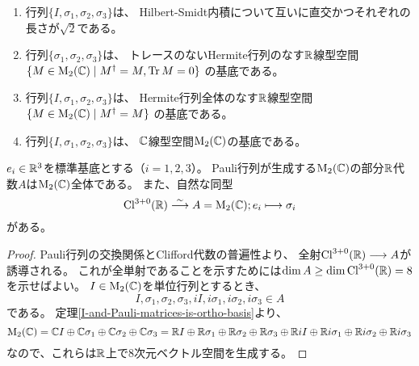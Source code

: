 \begin{thm}
  \label{I-and-Pauli-matrices-is-ortho-basis}
  \begin{enumerate}
    \item 行列$\{I, \sigma_1, \sigma_2, \sigma_3\}$は、
          Hilbert-Smidt内積について互いに直交かつそれぞれの長さが$\sqrt{2}$である。
    \item 行列$\{\sigma_1, \sigma_2, \sigma_3\}$は、
          トレースのないHermite行列のなす$\mathbb{R}$線型空間
          $\{M\in\operatorname{M}_2(\mathbb{C}) \mid M^\dagger=M, \operatorname{Tr} M = 0\}$
          の基底である。
    \item 行列$\{I, \sigma_1, \sigma_2, \sigma_3\}$は、
          Hermite行列全体のなす$\mathbb{R}$線型空間$\{M\in\operatorname{M}_2(\mathbb{C}) \mid M^\dagger=M\}$
          の基底である。
    \item 行列$\{I, \sigma_1, \sigma_2, \sigma_3\}$は、
          $\mathbb{C}$線型空間$\operatorname{M}_2(\mathbb{C})$の基底である。
  \end{enumerate}
\end{thm}

\begin{thm}
  $e_i \in \mathbb{R}^{3}$を標準基底とする（$i=1,2,3$）。
  Pauli行列が生成する$\operatorname{M}_2(\mathbb{C})$の部分$\mathbb{R}$代数$A$は$\operatorname{M}_2(\mathbb{C})$全体である。
  また、自然な同型
  \begin{equation}
    \operatorname{Cl}^{3+0}(\mathbb{R}) \stackrel{\sim}{\longrightarrow} A = \operatorname{M}_2(\mathbb{C}); e_i \longmapsto \sigma_i
  \end{equation}
  がある。
\end{thm}

\begin{proof}
  Pauli行列の交換関係とClifford代数の普遍性より、
  全射$\operatorname{Cl}^{3+0}(\mathbb{R})\longrightarrow A$が誘導される。
  これが全単射であることを示すためには$\dim A\geq\dim\operatorname{Cl}^{3+0}(\mathbb{R})=8$を示せばよい。
  $I\in\operatorname{M}_2(\mathbb{C})$を単位行列とするとき、
  \begin{equation}
    I, \sigma_1, \sigma_2, \sigma_3,
    iI, i\sigma_1, i\sigma_2, i\sigma_3 \in A
  \end{equation}
  である。
  定理\ref{I-and-Pauli-matrices-is-ortho-basis}より、
  \begin{equation}
  \operatorname{M}_2(\mathbb{C})=\mathbb{C} I\oplus\mathbb{C}\sigma_1\oplus\mathbb{C}\sigma_2\oplus\mathbb{C}\sigma_3
  =\mathbb{R} I\oplus\mathbb{R}\sigma_1\oplus\mathbb{R}\sigma_2\oplus\mathbb{R}\sigma_3
  \oplus\mathbb{R} iI\oplus\mathbb{R} i\sigma_1\oplus\mathbb{R} i\sigma_2\oplus\mathbb{R} i\sigma_3
  \end{equation}
  なので、これらは$\mathbb{R}$上で$8$次元ベクトル空間を生成する。
\end{proof}

